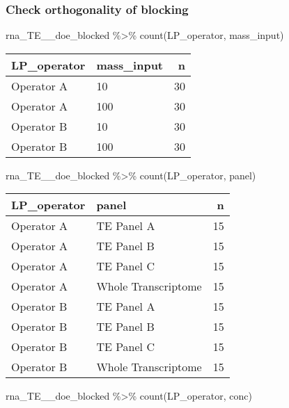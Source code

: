 \documentclass[
]{article}
\newenvironment{Shaded}{\begin{snugshade}}{\end{snugshade}}
\newcommand{\FunctionTok}[1]{\textcolor[rgb]{0.00,0.00,0.00}{#1}}
\newcommand{\NormalTok}[1]{#1}
\newcommand{\SpecialCharTok}[1]{\textcolor[rgb]{0.00,0.00,0.00}{#1}}
\begin{document}
\hypertarget{check-orthogonality-of-blocking}{%
\subsubsection{Check orthogonality of
blocking}\label{check-orthogonality-of-blocking}}

\begin{Shaded}
\begin{Highlighting}[]
\NormalTok{rna\_TE\_\_doe\_blocked }\SpecialCharTok{\%\textgreater{}\%} \FunctionTok{count}\NormalTok{(LP\_operator, mass\_input)}
\end{Highlighting}
\end{Shaded}

\begin{longtable}[]{@{}llr@{}}
\toprule()
LP\_operator & mass\_input & n \\
\midrule()
\endhead
Operator A & 10 & 30 \\
Operator A & 100 & 30 \\
Operator B & 10 & 30 \\
Operator B & 100 & 30 \\
\bottomrule()
\end{longtable}

\begin{Shaded}
\begin{Highlighting}[]
\NormalTok{rna\_TE\_\_doe\_blocked }\SpecialCharTok{\%\textgreater{}\%} \FunctionTok{count}\NormalTok{(LP\_operator, panel)}
\end{Highlighting}
\end{Shaded}

\begin{longtable}[]{@{}llr@{}}
\toprule()
LP\_operator & panel & n \\
\midrule()
\endhead
Operator A & TE Panel A & 15 \\
Operator A & TE Panel B & 15 \\
Operator A & TE Panel C & 15 \\
Operator A & Whole Transcriptome & 15 \\
Operator B & TE Panel A & 15 \\
Operator B & TE Panel B & 15 \\
Operator B & TE Panel C & 15 \\
Operator B & Whole Transcriptome & 15 \\
\bottomrule()
\end{longtable}

\begin{Shaded}
\begin{Highlighting}[]
\NormalTok{rna\_TE\_\_doe\_blocked }\SpecialCharTok{\%\textgreater{}\%} \FunctionTok{count}\NormalTok{(LP\_operator, conc)}
\end{Highlighting}
\end{Shaded}
\end{document}
